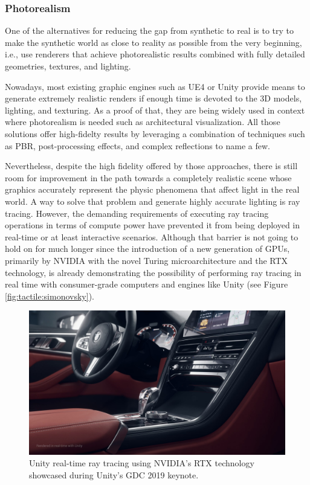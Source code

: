 \subsubsection{Photorealism}

One of the alternatives for reducing the gap from synthetic to real is to try to make the synthetic world as close to reality as possible from the very beginning, i.e., use renderers that achieve photorealistic results combined with fully detailed geometries, textures, and lighting.

Nowadays, most existing graphic engines such as \ac{UE4} or Unity provide means to generate extremely realistic renders if enough time is devoted to the \ac{3D} models, lighting, and texturing. As a proof of that, they are being widely used in context where photorealism is needed such as architectural visualization. All those solutions offer high-fidelty results by leveraging a combination of techniques such as \ac{PBR}, post-processing effects, and complex reflections to name a few.

Nevertheless, despite the high fidelity offered by those approaches, there is still room for improvement in the path towards a completely realistic scene whose graphics accurately represent the physic phenomena that affect light in the real world. A way to solve that problem and generate highly accurate lighting is ray tracing. However, the demanding requirements of executing ray tracing operations in terms of compute power have prevented it from being deployed in real-time or at least interactive scenarios. Although that barrier is not going to hold on for much longer since the introduction of a new generation of \acp{GPU}, primarily by NVIDIA with the novel Turing microarchitecture and the RTX technology, is already demonstrating the possibility of performing ray tracing in real time with consumer-grade computers and engines like Unity (see Figure \ref{fig:tactile:simonovsky}). 

\begin{figure}[!htb]
    \centering
    \includegraphics[width=\linewidth, clip, trim=0 275 0 0]{Figures/Sim2Real/unityrt.jpg}
    \caption{Unity real-time ray tracing using NVIDIA's RTX technology showcased during Unity's GDC 2019 keynote.}
    \label{fig:sim2real:unityrt}
\end{figure}

